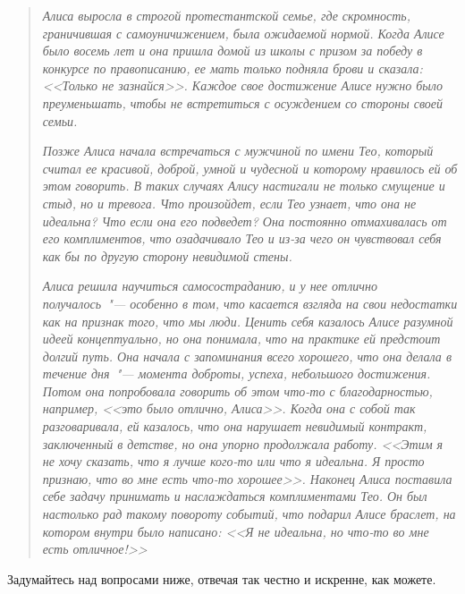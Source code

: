 \begin{quotation}
	\textit{
		Алиса выросла в строгой протестантской семье, где скромность, граничившая с самоуничижением, была ожидаемой нормой. Когда Алисе было восемь лет и она пришла домой из школы с призом за победу в конкурсе по правописанию, ее мать только подняла брови и сказала: <<Только не зазнайся>>. Каждое свое достижение Алисе нужно было преуменьшать, чтобы не встретиться с осуждением со стороны своей семьи.
	} 
	
	\textit{
		Позже Алиса начала встречаться с мужчиной по имени Тео, который считал ее красивой, доброй, умной и чудесной и которому нравилось ей об этом говорить. В таких случаях Алису настигали не только смущение и стыд, но и тревога. Что произойдет, если Тео узнает, что она не идеальна? Что если она его подведет? Она постоянно отмахивалась от его комплиментов, что озадачивало Тео и из-за чего он чувствовал себя как бы по другую сторону невидимой стены.
	}
	
	\textit{
		Алиса решила научиться самосостраданию, и у нее отлично получалось~"--- особенно в том, что касается взгляда на свои недостатки как на признак того, что мы люди. Ценить себя казалось Алисе разумной идеей концептуально, но она понимала, что на практике ей предстоит долгий путь. Она начала с запоминания всего хорошего, что она делала в течение дня~"--- момента доброты, успеха, небольшого достижения. Потом она попробовала говорить об этом что-то с благодарностью, например, <<это было отлично, Алиса>>. Когда она с собой так разговаривала, ей казалось, что она нарушает невидимый контракт, заключенный в детстве, но она упорно продолжала работу. <<Этим я не хочу сказать, что я лучше кого-то или что я идеальна. Я просто признаю, что во мне есть что-то хорошее>>. Наконец Алиса поставила себе задачу принимать и наслаждаться комплиментами Тео. Он был настолько рад такому повороту событий, что подарил Алисе браслет, на котором внутри было написано: <<Я не идеальна, но что-то во мне есть отличное!>>
	} 
\end{quotation}

\newpage
{} \label{Ex:How_Do_I_Relate_to_My_Good_Qualities?}

Задумайтесь над вопросами ниже, отвечая так честно и искренне, как можете.

